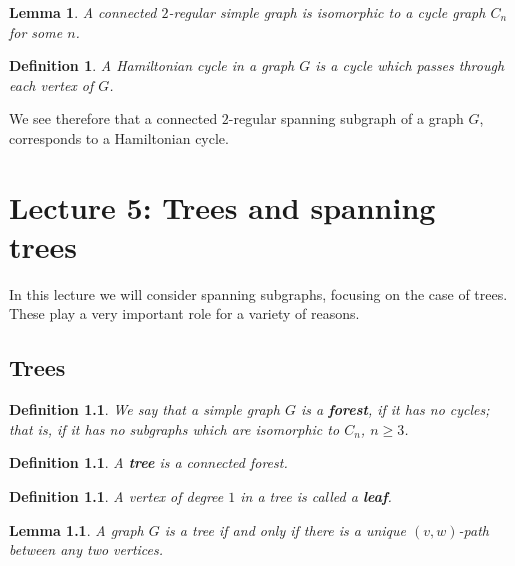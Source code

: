 \documentclass[12pt]{report}
\theoremstyle{plain}
\newtheorem{defn}[thm]{Definition}
\newtheorem{lem}[thm]{Lemma}
\newcommand{\Xb}[1]{\textbf{#1}\index{#1}}
\begin{document}
\begin{lem}
A connected $2$-regular simple graph is isomorphic to a cycle graph $C_n$
for some $n$.
\end{lem}

\begin{defn}
A Hamiltonian cycle in a graph $G$ is a cycle which passes through each
vertex of $G$.
\end{defn}

We see therefore that a connected $2$-regular spanning subgraph of a graph $G$,
corresponds to a Hamiltonian cycle. 


\chapter{Lecture 5: Trees and spanning trees} \label{lecture 5}

In this lecture we will consider spanning subgraphs, focusing on the case
of trees. These
play a very important role for a variety of reasons.

\section{Trees}

\begin{defn}
We say that a simple graph $G$ is a \Xb{forest}, if it has no cycles; that
is, if it has no subgraphs which are isomorphic to $C_n$, $n \geq 3$.
\end{defn}

\begin{defn}
A \Xb{tree} is a connected forest.
\end{defn}

\begin{defn}
A vertex of degree $1$ in a tree is called a \Xb{leaf}.
\end{defn}


\begin{lem} \label{tree unique path}
A graph $G$ is a tree if and only if there is a unique $(v, w)$-path
between any two vertices.
\end{lem}
\end{document}
